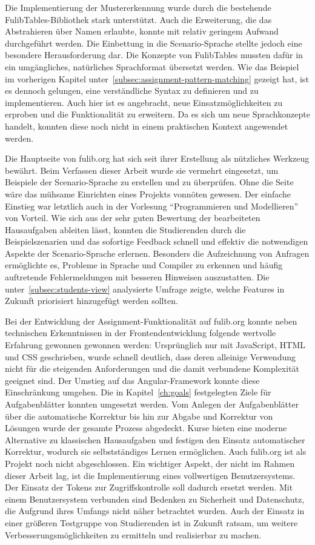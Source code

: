 Die Implementierung der Mustererkennung wurde durch die bestehende FulibTables-Bibliothek stark unterstützt.
Auch die Erweiterung, die das Abstrahieren über Namen erlaubte, konnte mit relativ geringem Aufwand durchgeführt werden.
Die Einbettung in die Scenario-Sprache stellte jedoch eine besondere Herausforderung dar.
Die Konzepte von FulibTables mussten dafür in ein umgängliches, natürliches Sprachformat übersetzt werden.
Wie das Beispiel im vorherigen Kapitel unter~\ref{subsec:assignment-pattern-matching} gezeigt hat, ist es dennoch gelungen, eine verständliche Syntax zu definieren und zu implementieren.
Auch hier ist es angebracht, neue Einsatzmöglichkeiten zu erproben und die Funktionalität zu erweitern.
Da es sich um neue Sprachkonzepte handelt, konnten diese noch nicht in einem praktischen Kontext angewendet werden.

Die Hauptseite von fulib.org hat sich seit ihrer Erstellung als nützliches Werkzeug bewährt.
Beim Verfassen dieser Arbeit wurde sie vermehrt eingesetzt, um Beispiele der Scenario-Sprache zu erstellen und zu überprüfen.
Ohne die Seite wäre das mühsame Einrichten eines Projekts vonnöten gewesen.
Der einfache Einstieg war letztlich auch in der Vorlesung ``Programmieren und Modellieren'' von Vorteil.
Wie sich aus der sehr guten Bewertung der bearbeiteten Hausaufgaben ableiten lässt, konnten die Studierenden durch die Beispielszenarien und das sofortige Feedback schnell und effektiv die notwendigen Aspekte der Scenario-Sprache erlernen.
Besonders die Aufzeichnung von Anfragen ermöglichte es, Probleme in Sprache und Compiler zu erkennen und häufig auftretende Fehlermeldungen mit besseren Hinweisen auszustatten.
Die unter~\ref{subsec:students-view} analysierte Umfrage zeigte, welche Features in Zukunft priorisiert hinzugefügt werden sollten.

Bei der Entwicklung der Assignment-Funktionalität auf fulib.org konnte neben technischen Erkenntnissen in der Frontendentwicklung folgende wertvolle Erfahrung gewonnen gewonnen werden:
Ursprünglich nur mit JavaScript, HTML und CSS geschrieben, wurde schnell deutlich, dass deren alleinige Verwendung nicht für die steigenden Anforderungen und die damit verbundene Komplexität geeignet sind.
Der Umstieg auf das Angular-Framework konnte diese Einschränkung umgehen.
Die in Kapitel~\ref{ch:goals} festgelegten Ziele für Aufgabenblätter konnten umgesetzt werden.
Vom Anlegen der Aufgabenblätter über die automatische Korrektur bis hin zur Abgabe und Korrektur von Lösungen wurde der gesamte Prozess abgedeckt.
Kurse bieten eine moderne Alternative zu klassischen Hausaufgaben und festigen den Einsatz automatischer Korrektur, wodurch sie selbstständiges Lernen ermöglichen.
Auch fulib.org ist als Projekt noch nicht abgeschlossen.
Ein wichtiger Aspekt, der nicht im Rahmen dieser Arbeit lag, ist die Implementierung eines vollwertigen Benutzersystems.
Der Einsatz der Tokens zur Zugriffskontrolle soll dadurch ersetzt werden.
Mit einem Benutzersystem verbunden sind Bedenken zu Sicherheit und Datenschutz, die Aufgrund ihres Umfangs nicht näher betrachtet wurden.
Auch der Einsatz in einer größeren Testgruppe von Studierenden ist in Zukunft ratsam, um weitere Verbesserungsmöglichkeiten zu ermitteln und realisierbar zu machen.
